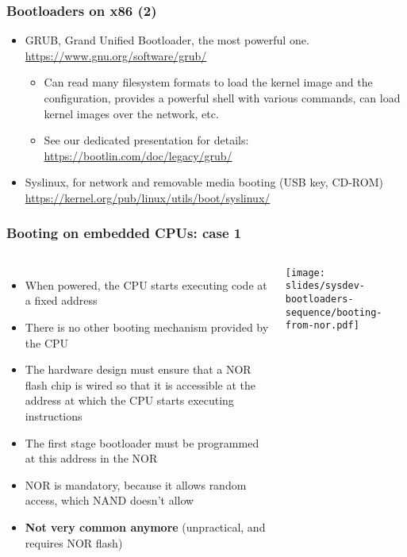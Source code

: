 \begin{frame}
  \frametitle{Bootloaders on x86 (2)}
  \begin{itemize}
  \item GRUB, Grand Unified Bootloader, the most powerful one.\\
    \url{https://www.gnu.org/software/grub/}
    \begin{itemize}
    \item Can read many filesystem formats to load the kernel image
      and the configuration, provides a powerful shell with various
      commands, can load kernel images over the network, etc.
    \item See our dedicated presentation for details:\\
      \url{https://bootlin.com/doc/legacy/grub/}
    \end{itemize}
  \item Syslinux, for network and removable media booting (USB key, CD-ROM)\\
    \small\url{https://kernel.org/pub/linux/utils/boot/syslinux/}\normalsize
  \end{itemize}
\end{frame}

\begin{frame}
  \frametitle{Booting on embedded CPUs: case 1}
  \begin{columns}
    \begin{itemize}
    \item When powered, the CPU starts executing code at a fixed address
    \item There is no other booting mechanism provided by the CPU
    \item The hardware design must ensure that a NOR flash chip is
      wired so that it is accessible at the address at which the CPU
      starts executing instructions
    \item The first stage bootloader must be programmed at this
      address in the NOR
    \item NOR is mandatory, because it allows random access, which
      NAND doesn't allow
    \item {\bf Not very common anymore} (unpractical, and requires NOR
      flash)
    \end{itemize}
    \texttt{[image: slides/sysdev-bootloaders-sequence/booting-from-nor.pdf]}
  \end{columns}
\end{frame}

